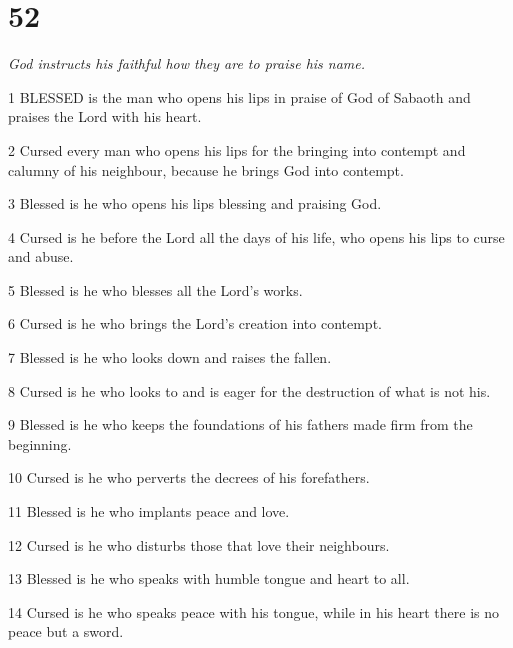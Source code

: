 \chapter{52}

\par \textit{God instructs his faithful how they are to praise his name.}

\par 1 BLESSED is the man who opens his lips in praise of God of Sabaoth and praises the Lord with his heart.

\par 2 Cursed every man who opens his lips for the bringing into contempt and calumny of his neighbour, because he brings God into contempt.

\par 3 Blessed is he who opens his lips blessing and praising God.

\par 4 Cursed is he before the Lord all the days of his life, who opens his lips to curse and abuse.

\par 5 Blessed is he who blesses all the Lord's works.

\par 6 Cursed is he who brings the Lord's creation into contempt.

\par 7 Blessed is he who looks down and raises the fallen.

\par 8 Cursed is he who looks to and is eager for the destruction of what is not his.

\par 9 Blessed is he who keeps the foundations of his fathers made firm from the beginning.

\par 10 Cursed is he who perverts the decrees of his forefathers.

\par 11 Blessed is he who implants peace and love.

\par 12 Cursed is he who disturbs those that love their neighbours.

\par 13 Blessed is he who speaks with humble tongue and heart to all.

\par 14 Cursed is he who speaks peace with his tongue, while in his heart there is no peace but a sword.

